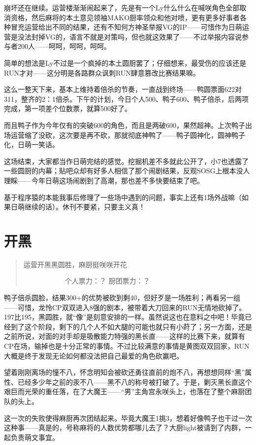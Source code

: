 崩坏还在继续。运营楼渐渐闹起来了，先是有一个Ly什么什么在喊咲角色全部取消资格，然后麻将的本土意见领袖MAKO厨率领众和他对喷，更有更多好事者各种冒充运营给出不同的结果，还有不知何方神圣举报VG的IP——可惜作为日萌运营是没法封掉VG的，语言不就是对策吗，但也就这效果了——不过举报内容说参与者200人——呵呵，呵呵，呵呵。

简单的想法是Ly不过是一个疯掉的本土圆厨罢了；仔细想来，最受伤的应该还是RUN才对——这分明是各路群众讽刺RUN肆意篡改比赛结果嘛。

这么一整天下来，基本上维持着倍杀的节奏，一直战到终场——鸭圆票面622对311，整齐的2：1倍杀。下午的计划，今日个人500、鸭子600、鸭子倍杀，后两项完成，第一项差个位数票，就算500好了。

而且鸭子作为今年仅有的突破600的角色，而且是两破600，果然超神。上次鸭子出场运营缩了没砍，这次要是再不砍，那就彻底神鸭了——鸭子圆神化，圆神鸭子化，日萌一笑话。

这场结束，大家都当作日萌完结的感觉。挖掘机差不多就此公开了，小7也透露了一些圆厨的内幕；贴吧众却有好多人相信了那个闹剧结果，反观SOSG上根本没人理睬——今年日萌这场闹剧到了高潮，那也差不多快要结束了吧。

基于程序猿的本能我事后修理了一些场中遇到的问题，事实上还有1场外战嘛（如果日萌继续的话）。休刊不要紧，只要主义真！


\section{开黑}
\begin{quote}
运营开黑黑圆胜，麻厨挺咲咲开花

　　　　　　个人票力：？ 厨团票力：？
\end{quote}

鸭子倍杀圆脸，结果300+的优势被砍到剩40，但好歹是一场胜利；再看另一组——可惜，龙怜CP双双进入8强的剧本，被带着大刀回来的RUN无情地砍掉了。197比195，黑圆胜，就“像”是刻意安排的一样。虽然说这也在意料之中吧！毕竟已经到了这个阶段，剩下的几个人不如大腿的可能也就只有小莳了；另一方面，还是之前所说，对面的对手却是吸散能力特强的黑长直——这样的比赛下来，就算有CP在场，输掉也是十分正常的事情。不过比较满意的事情是黄图双双回家，RUN大概是终于发现无论如何都没法把自己最爱的角色砍赢吧。

望着刚刚离场的憧不八，怀念明知会被砍还勇往直前的炮不八，再想想同样“黑”属性、已经多少年之前的汞不八——黑不八的称号被打破了。于是，剿灭黑长直这个艰巨而光荣的重任落，在了大魔王——“男”主角宫永咲头上，也落在了整个麻厨团队的头上。

这一次的失败使得麻厨再次团结起来。毕竟大魔王1挑3，想着好像鸭子也干过一次这种事——真是的，号称麻将的人数优势都哪儿去了？大厨light被请到了内群，一起负责萌文事宜。

